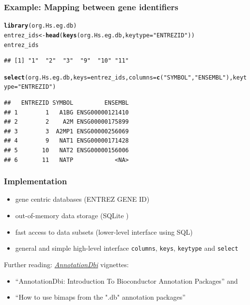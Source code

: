 \documentclass{beamer}\usepackage[]{graphicx}\usepackage[]{color}
\makeatletter
\newcommand{\hlstr}[1]{\textcolor[rgb]{0.192,0.494,0.8}{#1}}%
\newcommand{\hlstd}[1]{\textcolor[rgb]{0.345,0.345,0.345}{#1}}%
\newcommand{\hlkwb}[1]{\textcolor[rgb]{0.69,0.353,0.396}{#1}}%
\newcommand{\hlkwc}[1]{\textcolor[rgb]{0.333,0.667,0.333}{#1}}%
\newcommand{\hlkwd}[1]{\textcolor[rgb]{0.737,0.353,0.396}{\textbf{#1}}}%
\newenvironment{kframe}{%
 \def\at@end@of@kframe{}%
 \ifinner\ifhmode%
  \def\at@end@of@kframe{\end{minipage}}%
  \begin{minipage}{\columnwidth}%
 \fi\fi%
 \def\FrameCommand##1{\hskip\@totalleftmargin \hskip-\fboxsep
 \colorbox{shadecolor}{##1}\hskip-\fboxsep
     \hskip-\linewidth \hskip-\@totalleftmargin \hskip\columnwidth}%
 \MakeFramed {\advance\hsize-\width
   \@totalleftmargin\z@ \linewidth\hsize
   \@setminipage}}%
 {\par\unskip\endMakeFramed%
 \at@end@of@kframe}
\newenvironment{knitrout}{}{} %
\newcommand{\Rpackage}[1]{{\usebeamercolor[fg]{structure} \textsl{#1}}}
\newcommand\Biocpkg[1]{%
  {\href{http://bioconductor.org/packages/release/bioc/html/#1.html}%
    {\Rpackage{#1}}}}
\newcommand{\Rcode}[1]{\texttt{#1}}
\newcommand{\Rfunction}[1]{\Rcode{#1}}
\makeatother
\begin{document}
\begin{frame}[fragile]
  \frametitle{Example: Mapping between gene identifiers}
\begin{knitrout}\tiny
{}\color{fgcolor}\begin{kframe}
\begin{alltt}
\hlkwd{library}\hlstd{(org.Hs.eg.db)}
\hlstd{entrez_ids} \hlkwb{<-} \hlkwd{head}\hlstd{(}\hlkwd{keys}\hlstd{(org.Hs.eg.db,} \hlkwc{keytype}\hlstd{=}\hlstr{"ENTREZID"}\hlstd{))}
\hlstd{entrez_ids}
\end{alltt}
\begin{verbatim}
## [1] "1"  "2"  "3"  "9"  "10" "11"
\end{verbatim}
\begin{alltt}
\hlkwd{select}\hlstd{(org.Hs.eg.db,} \hlkwc{keys}\hlstd{=entrez_ids,} \hlkwc{columns}\hlstd{=}\hlkwd{c}\hlstd{(}\hlstr{"SYMBOL"}\hlstd{,}\hlstr{"ENSEMBL"}\hlstd{),} \hlkwc{keytype}\hlstd{=}\hlstr{"ENTREZID"}\hlstd{)}
\end{alltt}


{\ttfamily\noindent\itshape\color{messagecolor}{\#\# 'select()' returned 1:1 mapping between keys and columns}}\begin{verbatim}
##   ENTREZID SYMBOL         ENSEMBL
## 1        1   A1BG ENSG00000121410
## 2        2    A2M ENSG00000175899
## 3        3  A2MP1 ENSG00000256069
## 4        9   NAT1 ENSG00000171428
## 5       10   NAT2 ENSG00000156006
## 6       11   NATP            <NA>
\end{verbatim}
\end{kframe}
\end{knitrout}
\end{frame}

\begin{frame}
  \frametitle{Implementation}
  \begin{itemize}
  \item gene centric databases (ENTREZ GENE ID)
  \item out-of-memory data storage (SQLite )
  \item fast access to data subsets (lower-level interface using SQL)
  \item general and simple high-level interface \Rfunction{columns}, \Rfunction{keys}, \Rfunction{keytype} and \Rfunction{select}
  \end{itemize}
  \vfill
  Further reading: \Biocpkg{AnnotationDbi} vignettes:
  \begin{itemize}
  \item[]``AnnotationDbi: Introduction To Bioconductor Annotation Packages'' and
  \item[] ``How to use bimaps from the ".db" annotation packages''
  \end{itemize}
\end{frame}
\end{document}
